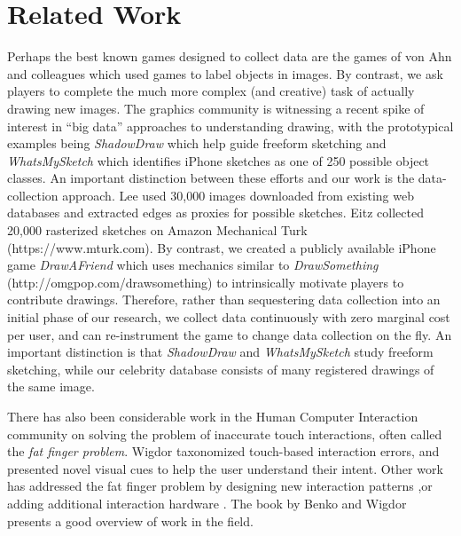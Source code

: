 \section{Related Work}

Perhaps the best known games designed to collect data are the games of von Ahn and colleagues  which used games to label objects in images. By contrast, we ask players to complete the much more complex (and creative) task of actually drawing new images. The graphics community is witnessing a recent spike of interest in ``big data'' approaches to understanding drawing, with the prototypical examples being \emph{ShadowDraw} \cite{Lee:2011} which help guide freeform sketching and \emph{WhatsMySketch} \cite{Eitz:2012:HSO} which identifies iPhone sketches as one of 250 possible object classes. An important distinction between these efforts and our work is the data-collection approach. Lee \etal used 30,000 images downloaded from existing web databases and extracted edges as proxies for possible sketches. Eitz \etal collected 20,000 rasterized sketches on Amazon Mechanical Turk (https://www.mturk.com). By contrast, we created a publicly available iPhone game \emph{DrawAFriend} which uses mechanics similar to \emph{DrawSomething} (http://omgpop.com/drawsomething) to intrinsically motivate players to contribute drawings. Therefore, rather than sequestering data collection into an initial phase of our research, we collect data continuously with zero marginal cost per user, and can re-instrument the game to change data collection on the fly. An important distinction is that \emph{ShadowDraw} and \emph{WhatsMySketch} study freeform sketching, while our celebrity database consists of many registered drawings of the same image.

There has also been considerable work in the Human Computer Interaction community on solving the problem of inaccurate touch interactions, often called the \emph{fat finger problem}. Wigdor \etal {} taxonomized touch-based interaction errors, and presented novel visual cues to help the user understand their intent. Other work has addressed the fat finger problem by designing new interaction patterns \cite{Albinsson:2003:HPT,Benko:2006:PST,Forlines06hybridpointing,Vogel07shift:a},or adding additional interaction hardware \cite{Scott:2010:RTE,Wigdor:2006:UTI,Wigdor:2007:LTS}. The book by Benko and Wigdor  presents a good overview of work in the field.

